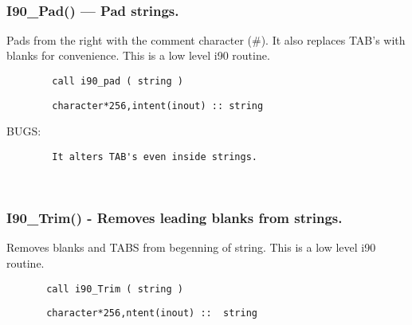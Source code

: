  
\mbox{}\hrulefill\ 
 
  \subsubsection{I90\_Pad() --- Pad strings. }

       Pads from the right with the comment character (\#). It also
    replaces TAB's with blanks for convenience. This is a low level
    i90 routine.
  
\begin{verbatim}        call i90_pad ( string )\end{verbatim}
\begin{verbatim}
        character*256,intent(inout) :: string
\end{verbatim}
{\sf BUGS:}
\begin{verbatim}        It alters TAB's even inside strings.\end{verbatim}%
 
 
\mbox{}\hrulefill\ 
 
  \subsubsection{I90\_Trim() - Removes leading blanks from strings. }

      Removes blanks and TABS from begenning of string. 
      This is a low level i90 routine.
   
\begin{verbatim}       call i90_Trim ( string )\end{verbatim}
\begin{verbatim}
       character*256,ntent(inout) ::  string 
\end{verbatim}
 
